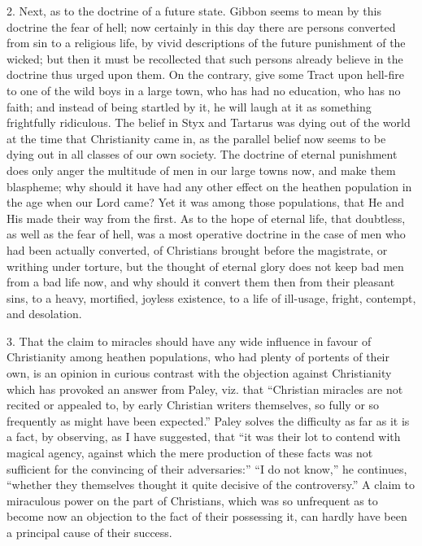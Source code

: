 2. Next, as to the doctrine of a future state. Gibbon seems to mean
by this doctrine the fear of hell; now certainly in this day there are
persons converted from sin to a religious life, by vivid descriptions
of the future punishment of the wicked; but then it must be
recollected that such persons already believe in the doctrine thus
urged upon them. On the contrary, give some Tract upon hell-fire to
one of the wild boys in a large town, who has had no education, who
has no faith; and instead of being startled by it, he will laugh at it
as something frightfully ridiculous. The belief in Styx and Tartarus was dying out of the world at the
time that Christianity came in, as the parallel belief now seems to be
dying out in all classes of our own society. The doctrine of eternal
punishment does only anger the multitude of men in our large towns
now, and make them blaspheme; why should it have had any other effect
on the heathen population in the age when our Lord came? Yet it was
among those populations, that He and His made their way from the
first. As to the hope of eternal life, that doubtless, as well as the
fear of hell, was a most operative doctrine in the case of men who had
been actually converted, of Christians brought before the magistrate,
or writhing under torture, but the thought of eternal glory does not
keep bad men from a bad life now, and why should it convert them then
from their pleasant sins, to a heavy, mortified, joyless existence, to
a life of ill-usage, fright, contempt, and desolation.

3. That the claim to miracles should have any wide influence in
favour of Christianity among heathen populations, who had plenty of
portents of their own, is an opinion in curious contrast with the
objection against Christianity which has provoked an answer from Paley,
viz. that ``Christian miracles are not recited or appealed to, by
early Christian writers themselves, so fully or so frequently as might
have been expected.'' Paley solves the difficulty as far as it is
a fact, by observing, as I have suggested, that ``it was their lot
to contend with magical agency, against which the mere production of
these facts was not sufficient for the convincing of their
adversaries:'' ``I do not know,'' he continues,
``whether they themselves thought it quite decisive of the
controversy.'' A claim to miraculous power on the part of
Christians, which was so unfrequent as to become now an objection to
the fact of their possessing it, can hardly have been a principal
cause of their success.

